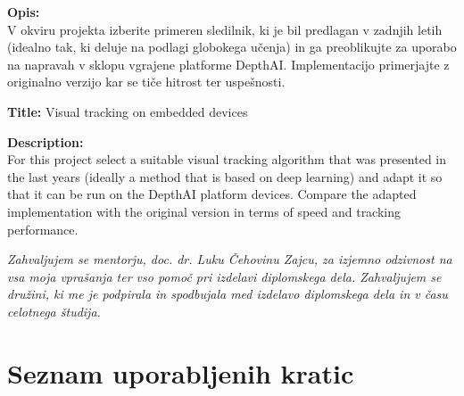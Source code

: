 \documentclass[a4paper,12pt,openright]{book}
\newcommand{\clearemptydoublepage}{\newpage{\pagestyle{empty}\cleardoublepage}}
\begin{document}
\bigskip
\noindent\textbf{Opis:}\\
V okviru projekta izberite primeren sledilnik, ki je bil predlagan v zadnjih letih (idealno tak, ki deluje na podlagi globokega učenja) in ga preoblikujte za uporabo na napravah v sklopu vgrajene platforme DepthAI. Implementacijo primerjajte z originalno verzijo kar se tiče hitrost ter uspešnosti.

\bigskip
\noindent\textbf{Title:} Visual tracking on embedded devices

\bigskip
\noindent\textbf{Description:}\\
For this project select a suitable visual tracking algorithm that was presented in the last years (ideally a method that is based on deep learning) and adapt it so that it can be run on the DepthAI platform devices. Compare the adapted implementation with the original version in terms of speed and tracking performance.

\vfill



\vspace{2cm}

\clearemptydoublepage

\thispagestyle{empty}\mbox{}\vfill\null\it%
\noindent
Zahvaljujem se mentorju, doc. dr. Luku Čehovinu Zajcu, za izjemno odzivnost na vsa moja vprašanja ter vso pomoč pri izdelavi diplomskega dela. Zahvaljujem se družini, ki me je podpirala in spodbujala med izdelavo diplomskega dela in v času celotnega študija.
\rm\normalfont

\clearemptydoublepage


\clearemptydoublepage


\pagestyle{empty}
\def\thepage{}%
\tableofcontents{}


\clearemptydoublepage


\chapter*{Seznam uporabljenih kratic}
\end{document}
